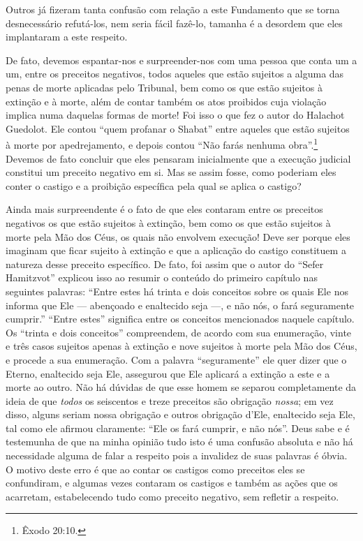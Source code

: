 Outros já fizeram tanta confusão com relação a este Fundamento que se
torna desnecessário refutá-los, nem seria fácil fazê-lo, tamanha é a
desordem que eles implantaram a este respeito.

De fato, devemos espantar-nos e surpreender-nos com uma pessoa que conta
um a um, entre os preceitos negativos, todos aqueles que estão sujeitos
a alguma das penas de morte aplicadas pelo Tribunal, bem como os que
estão sujeitos à extinção e à morte, além de contar também os atos
proibidos cuja violação implica numa daquelas formas de morte! Foi isso
o que fez o autor do Halachot Guedolot. Ele contou ``quem profanar o
Shabat'' entre aqueles que estão sujeitos à morte por apedrejamento, e
depois contou ``Não farás nenhuma obra''.\footnote{Êxodo 20:10.} Devemos de fato
concluir que eles pensaram inicialmente que a execução judicial
constitui um preceito negativo em si. Mas se assim fosse, como poderiam
eles conter o castigo e a proibição específica pela qual se aplica o
castigo?

Ainda mais surpreendente é o fato de que eles contaram entre os
preceitos negativos os que estão sujeitos à extinção, bem como os que
estão sujeitos à morte pela Mão dos Céus, os quais não envolvem
execução! Deve ser porque eles imaginam que ficar sujeito à extinção e
que a aplicação do castigo constituem a natureza desse preceito
específico. De fato, foi assim que o autor do ``Sefer Hamitzvot''
explicou isso ao resumir o conteúdo do primeiro capítulo nas seguintes
palavras: ``Entre estes há trinta e dois conceitos sobre os quais Ele
nos informa que Ele --- abençoado e enaltecido seja ---, e não nós, o
fará seguramente cumprir.'' ``Entre estes'' significa entre os conceitos
mencionados naquele capítulo. Os ``trinta e dois conceitos''
compreendem, de acordo com sua enumeração, vinte e três casos sujeitos
apenas à extinção e nove sujeitos à morte pela Mão dos Céus, e procede a
sua enumeração. Com a palavra ``seguramente'' ele quer dizer que o
Eterno, enaltecido seja Ele, assegurou que Ele aplicará a extinção a
este e a morte ao outro. Não há dúvidas de que esse homem se separou
completamente da ideia de que \emph{todos} os seiscentos e treze
preceitos são obrigação \emph{nossa}; em vez disso, alguns seriam nossa
obrigação e outros obrigação d'Ele, enaltecido seja Ele, tal como ele
afirmou claramente: ``Ele os fará cumprir, e não nós''. Deus sabe e é
testemunha de que na minha opinião tudo isto é uma confusão absoluta e
não há necessidade alguma de falar a respeito pois a invalidez de suas
palavras é óbvia. O motivo deste erro é que ao contar os castigos como
preceitos eles se confundiram, e algumas vezes contaram os castigos e
também as ações que os acarretam, estabelecendo tudo como preceito
negativo, sem refletir a respeito.

